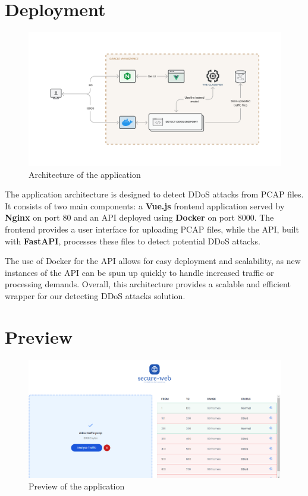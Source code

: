 \section{Deployment}

\begin{figure}[h]
	\centering
	\includegraphics[width=1\textwidth]{./assets/images/architecture.png}
	\caption{Architecture of the application}
\end{figure}

The application architecture is designed to detect DDoS attacks from PCAP files. It consists of two main components: a \textbf{Vue.js} frontend application served by \textbf{Nginx} on port 80 and an API deployed using \textbf{Docker} on port 8000. The frontend provides a user interface for uploading PCAP files, while the API, built with \textbf{FastAPI}, processes these files to detect potential DDoS attacks.

The use of Docker for the API allows for easy deployment and scalability, as new instances of the API can be spun up quickly to handle increased traffic or processing demands. Overall, this architecture provides a scalable and efficient wrapper for our detecting DDoS attacks solution.

\clearpage

\section{Preview}
\begin{figure}[h]
	\centering
	\includegraphics[width=1\textwidth]{./assets/images/preview.png}
	\caption{Preview of the application}
\end{figure} 